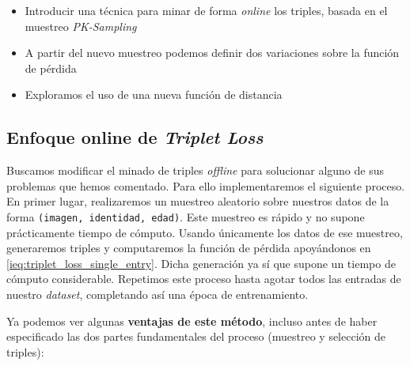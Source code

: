 \begin{itemize}
    \item Introducir una técnica para minar de forma \textit{online} los triples, basada en el muestreo \textit{PK-Sampling}
    \item A partir del nuevo muestreo podemos definir dos variaciones sobre la función de pérdida
    \item Exploramos el uso de una nueva función de distancia
\end{itemize}

\subsection{Enfoque online de \textit{Triplet Loss}} \label{isubs:triples_online}

Buscamos modificar el minado de triples \textit{offline} para solucionar alguno de sus problemas que hemos comentado. Para ello implementaremos el siguiente proceso. En primer lugar, realizaremos un muestreo aleatorio sobre nuestros datos de la forma \lstinline{(imagen, identidad, edad)}. Este muestreo es rápido y no supone prácticamente tiempo de cómputo. Usando únicamente los datos de ese muestreo, generaremos triples y computaremos la función de pérdida apoyándonos en \eqref{ieq:triplet_loss_single_entry}. Dicha generación ya sí que supone un tiempo de cómputo considerable. Repetimos este proceso hasta agotar todos las entradas de nuestro \textit{dataset}, completando así una época de entrenamiento.

Ya podemos ver algunas \textbf{ventajas de este método}, incluso antes de haber especificado las dos partes fundamentales del proceso (muestreo y selección de triples):

